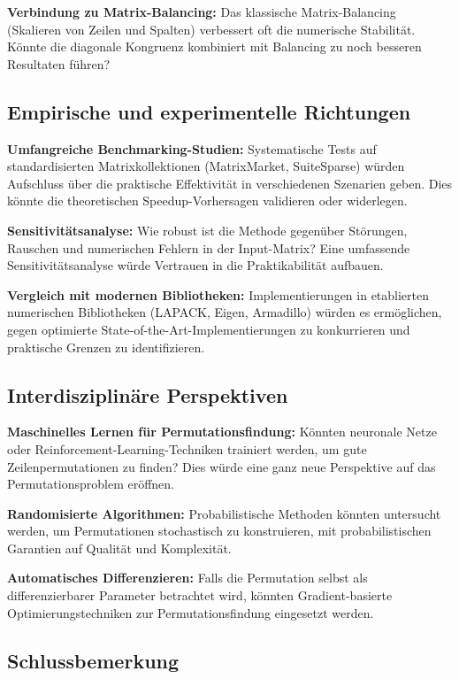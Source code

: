 \documentclass[a4paper,12pt]{article}
\theoremstyle{definition}
\begin{document}
\textbf{Verbindung zu Matrix-Balancing:} Das klassische Matrix-Balancing (Skalieren von Zeilen und Spalten) verbessert oft die numerische Stabilität. Könnte die diagonale Kongruenz kombiniert mit Balancing zu noch besseren Resultaten führen?

\subsection*{Empirische und experimentelle Richtungen}

\textbf{Umfangreiche Benchmarking-Studien:} Systematische Tests auf standardisierten Matrixkollektionen (MatrixMarket, SuiteSparse) würden Aufschluss über die praktische Effektivität in verschiedenen Szenarien geben. Dies könnte die theoretischen Speedup-Vorhersagen validieren oder widerlegen.

\textbf{Sensitivitätsanalyse:} Wie robust ist die Methode gegenüber Störungen, Rauschen und numerischen Fehlern in der Input-Matrix? Eine umfassende Sensitivitätsanalyse würde Vertrauen in die Praktikabilität aufbauen.

\textbf{Vergleich mit modernen Bibliotheken:} Implementierungen in etablierten numerischen Bibliotheken (LAPACK, Eigen, Armadillo) würden es ermöglichen, gegen optimierte State-of-the-Art-Implementierungen zu konkurrieren und praktische Grenzen zu identifizieren.

\subsection*{Interdisziplinäre Perspektiven}

\textbf{Maschinelles Lernen für Permutationsfindung:} Könnten neuronale Netze oder Reinforcement-Learning-Techniken trainiert werden, um gute Zeilenpermutationen zu finden? Dies würde eine ganz neue Perspektive auf das Permutationsproblem eröffnen.

\textbf{Randomisierte Algorithmen:} Probabilistische Methoden könnten untersucht werden, um Permutationen stochastisch zu konstruieren, mit probabilistischen Garantien auf Qualität und Komplexität.

\textbf{Automatisches Differenzieren:} Falls die Permutation selbst als differenzierbarer Parameter betrachtet wird, könnten Gradient-basierte Optimierungstechniken zur Permutationsfindung eingesetzt werden.

\subsection*{Schlussbemerkung}
\end{document}
